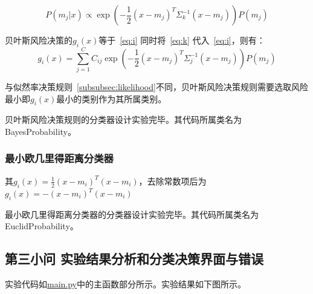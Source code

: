 \documentclass[UTF8]{article} %
\begin{document}
    \begin{equation}
        P(m_j|x) \propto \exp\left( -\frac{1}{2}(x-m_j)^T\Sigma_k^{-1}(x-m_j) \right) P(m_j) \label{eq:k}
    \end{equation}

    贝叶斯风险决策的$g_i(x)$等于~\eqref {eq:i} 同时将~\eqref {eq:k} 代入~\eqref {eq:i}，则有：
    \begin{equation}
        g_i(x) = \sum_{j = 1}^{C} C_{ij} \exp\left( -\frac{1}{2}(x-m_j)^T\Sigma_j^{-1}(x-m_j) \right) P(m_j) \label{eq:l}
    \end{equation}

    与似然率决策规则~\ref{subsubsec:likelihood}不同，贝叶斯风险决策规则需要选取风险最小即$g_i(x)$最小的类别作为其所属类别。

    贝叶斯风险决策规则的分类器设计实验完毕。其代码所属类名为 BayesProbability。

    \subsubsection{最小欧几里得距离分类器}
    其$g_i(x) = \frac{1}{2}(x-m_i)^T(x-m_i)$，去除常数项后为$g_i(x) =  -(x-m_i)^T(x-m_i)$

    最小欧几里得距离分类器的分类器设计实验完毕。其代码所属类名为 EuclidProbability。

    \subsection{第三小问 实验结果分析和分类决策界面与错误}
    实验代码如\href{run:main.py}{main.py}中的主函数部分所示。实验结果如下图所示。
\end{document}

